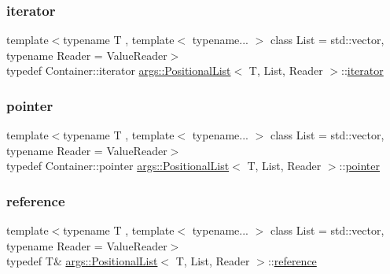 \subsubsection{\texorpdfstring{iterator}{iterator}}
{\footnotesize\ttfamily template$<$typename T , template$<$ typename... $>$ class List = std\+::vector, typename Reader  = Value\+Reader$>$ \\
typedef Container\+::iterator \hyperlink{classargs_1_1_positional_list}{args\+::\+Positional\+List}$<$ T, List, Reader $>$\+::\hyperlink{classargs_1_1_positional_list_ad0833c77245d7bc7678de4896d8443da}{iterator}}

\mbox{\label{classargs_1_1_positional_list_a547bf6009a6f68292fbf2627d4cd5e72}} 
\subsubsection{\texorpdfstring{pointer}{pointer}}
{\footnotesize\ttfamily template$<$typename T , template$<$ typename... $>$ class List = std\+::vector, typename Reader  = Value\+Reader$>$ \\
typedef Container\+::pointer \hyperlink{classargs_1_1_positional_list}{args\+::\+Positional\+List}$<$ T, List, Reader $>$\+::\hyperlink{classargs_1_1_positional_list_a547bf6009a6f68292fbf2627d4cd5e72}{pointer}}

\mbox{\label{classargs_1_1_positional_list_ada9aac6f988dbee6f3310158c23373a4}} 
\subsubsection{\texorpdfstring{reference}{reference}}
{\footnotesize\ttfamily template$<$typename T , template$<$ typename... $>$ class List = std\+::vector, typename Reader  = Value\+Reader$>$ \\
typedef T\& \hyperlink{classargs_1_1_positional_list}{args\+::\+Positional\+List}$<$ T, List, Reader $>$\+::\hyperlink{classargs_1_1_positional_list_ada9aac6f988dbee6f3310158c23373a4}{reference}}

\mbox{\label{classargs_1_1_positional_list_ab279be9deebae66a8084ba49d532cace}} 
